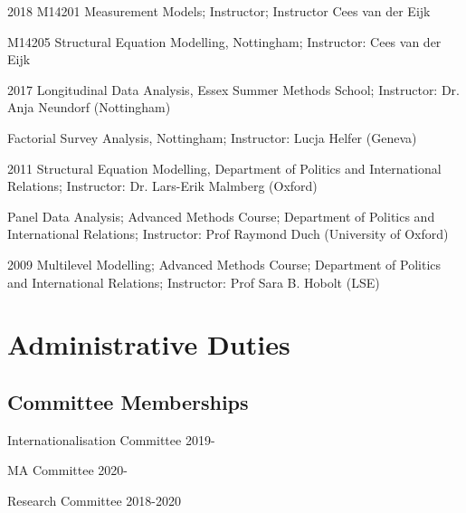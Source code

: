 \documentclass[12pt,letterpaper]{report}
\newcommand{\listitemspace}{0.25em}
\renewenvironment{itemize}
{\begin{list}{}{\setlength{\leftmargin}{0em}
                \setlength{\parskip}{0em}
                \setlength{\itemsep}{\listitemspace}
                \setlength{\parsep}{\listitemspace}}}
{\end{list}}
\begin{document}
\begin{tablist}
	
	\item[2018]   \tab{}M14201 Measurement Models; Instructor; Instructor Cees van der Eijk

	
	\item[]   \tab{}M14205 Structural Equation Modelling, Nottingham; Instructor: Cees van der Eijk
	
	\item[2017] \tab{}Longitudinal Data Analysis, Essex Summer Methods School; Instructor: Dr. Anja Neundorf (Nottingham)\\
	
	\item[] \tab{}Factorial Survey Analysis, Nottingham; Instructor: Lucja Helfer (Geneva)
	
	
	\item[2011] \tab{}Structural Equation Modelling, Department of Politics and International Relations; Instructor: Dr. Lars-Erik Malmberg (Oxford) 
	
   \item[] \tab{}Panel Data Analysis; Advanced Methods Course; Department of Politics and International Relations; Instructor: Prof Raymond Duch (University of Oxford)
	
	
	\item[2009] \tab{}Multilevel Modelling; Advanced Methods Course; Department of Politics and International Relations; Instructor: Prof Sara B. Hobolt (LSE)
	
	
\end{tablist}


\section*{Administrative Duties}

\subsection*{Committee Memberships}
\begin{itemize}
	\item Internationalisation Committee 2019-
	\item MA Committee 2020-
	\item Research Committee 2018-2020
	
\end{itemize}
\end{document}
